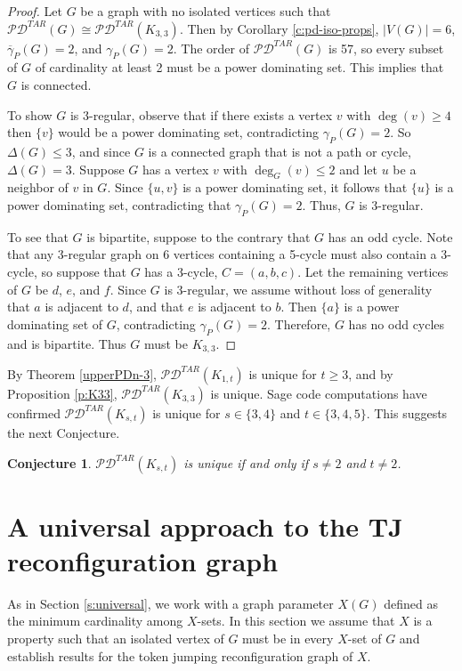 \documentclass{article}
\numberwithin{figure}{section}   %
\newtheorem{conj}[thm]{Conjecture}
\theoremstyle{definition}
\theoremstyle{definition}
\theoremstyle{definition}
\newcommand{\ol}{\overline}
\newcommand{\pd}{\gamma_P}
\newcommand{\pdbar}{\ol\pd}
\newcommand{\tar}{\mathscr{PD}^{TAR}}
\begin{document}
\begin{proof}
Let $G$ be a graph with no isolated vertices such that  $\tar(G)\cong \tar(K_{3,3})$. Then by Corollary \ref{c:pd-iso-props},  $|V(G)|=6$,  $\pdbar(G)=2$, and $\pd(G)=2$. The order of $\tar(G)$ is 57, so every subset of $G$ of cardinality at least 2 must be a power dominating set. This implies that $G$ is connected. 

To show $G$ is $3$-regular, observe that if there exists a vertex $v$ with $\deg(v)\geq 4$ then $\{v\}$ would be a power dominating set, contradicting $\pd(G)=2$. So $\Delta(G)\leq 3$, and since $G$ is a connected graph that is not a path or cycle,  $\Delta(G)=3$. Suppose $G$ has a vertex $v$ with $\deg_G(v)\le 2$ and let $u$ be a neighbor of $v$ in $G.$ Since $\{u,v\}$ is a power dominating set, it follows that $\{u\}$ is a power dominating set, contradicting that $\gamma_P(G)=2.$ Thus, $G$ is 3-regular. 

To see that $G$ is bipartite, suppose to the contrary that $G$ has an odd cycle. Note that any 3-regular graph on 6 vertices containing a 5-cycle must also contain a 3-cycle, so suppose that $G$ has a 3-cycle, $C=(a,b,c)$. Let the remaining vertices of $G$ be $d$, $e$, and $f$.  Since $G$ is 3-regular, we assume without loss of generality that $a$ is adjacent to  $d$, and that $e$ is adjacent to  $b$. Then $\{a\}$ is a power dominating set of $G$, contradicting $\gamma_P(G)=2.$  Therefore, $G$ has no odd cycles and is bipartite. Thus $G$ must be $K_{3,3}.$
\end{proof}

 By Theorem \ref{upperPDn-3}, $\tar(K_{1,t})$ is unique for $t\ge 3$, and by Proposition \ref{p:K33}, $\tar(K_{3,3})$ is unique. Sage code computations have confirmed $\tar(K_{s,t})$ is unique for $s\in\{3,4\}$ and $t\in\{3,4,5\}$. This suggests the next Conjecture.
\begin{conj} $\tar(K_{s,t})$ is   unique if and only if $s\ne 2$ and $t\ne 2$.
\end{conj}


\section{A universal approach to the TJ reconfiguration graph}\label{s:universal-TE}

As in Section \ref{s:universal}, we work with a graph parameter $X(G)$ defined as the minimum cardinality among $X$-sets. 
In this section we assume that $X$ is a property such that an isolated vertex of $G$ must be in every $X$-set of $G$ and establish results for the token jumping reconfiguration graph of $X$.  
\end{document}
